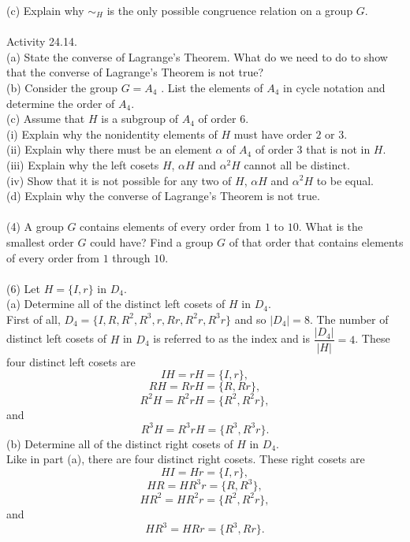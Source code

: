 \documentclass[11pt,a4paper]{article}
\begin{document}
(c) Explain why $\sim_H$ is the only possible congruence relation on a group $G$.\\
~\\
Activity 24.14.\\
(a) State the converse of Lagrange's Theorem. What do we need to do to show that the converse of Lagrange's Theorem is not true?\\
(b) Consider the group $G = A_4$ . List the elements of $A_4$ in cycle notation and determine the order of $A_4$.\\
(c) Assume that $H$ is a subgroup of $A_4$ of order $6$.\\
(i) Explain why the nonidentity elements of $H$ must have order $2$ or $3$.\\
(ii) Explain why there must be an element $\alpha$ of $A_4$ of order $3$ that is not in $H$.\\
(iii) Explain why the left cosets $H$, $\alpha H$ and $\alpha^2 H$ cannot all be distinct.\\
(iv) Show that it is not possible for any two of $H$, $\alpha H$ and $\alpha^2 H$ to be equal.\\
(d) Explain why the converse of Lagrange's Theorem is not true.\\
~\\
(4) A group $G$ contains elements of every order from $1$ to $10$. What is the smallest order $G$ could have? Find a group $G$ of that order that contains elements of every order from $1$ through $10$.\\
~\\
(6) Let $H = \{I, r\}$ in $D_4$.\\
(a) Determine all of the distinct left cosets of $H$ in $D_4$.\\
First of all, $D_4 = \{I, R, R^2, R^3, r, Rr, R^2r, R^3r\}$ and so $|D_4| = 8$. The number of distinct left cosets of $H$ in $D_4$ is referred to as the index and is $\dfrac{|D_4|}{|H|} = 4$. These four distinct left cosets are
\[IH = rH = \{I, r\},\] 
\[RH = RrH = \{R, Rr\},\]
\[R^2H = R^2rH = \{R^2, R^2r\},\]
and
\[R^3H = R^3rH = \{R^3, R^3r\}.\]
(b) Determine all of the distinct right cosets of $H$ in $D_4$.\\
Like in part (a), there are four distinct right cosets. These right cosets are
\[HI = Hr = \{I,r\},\]
\[HR = HR^3r = \{R,R^3\},\]
\[HR^2 = HR^2r = \{R^2, R^2r\},\]
and
\[HR^3 = HRr = \{R^3,Rr\}.\]
\end{document}
